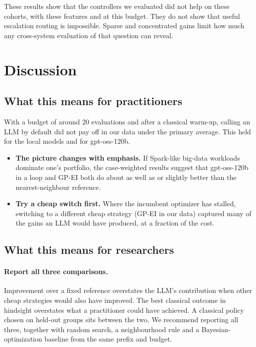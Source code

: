 These results show that the controllers we evaluated did not help on these cohorts, with these features and at this budget. They do not show that useful escalation routing is impossible. Sparse and concentrated gains limit how much any cross-system evaluation of that question can reveal.

\section{Discussion}

\subsection{What this means for practitioners}

With a budget of around 20 evaluations and after a classical warm-up, calling an LLM by default did not pay off in our data under the primary average. This held for the local models and for gpt-oss-120b.
\begin{itemize}
  \item \textbf{The picture changes with emphasis.} If Spark-like big-data workloads dominate one's portfolio, the case-weighted results suggest that gpt-oss-120b in a loop and GP-EI both do about as well as or slightly better than the nearest-neighbour reference.
  \item \textbf{Try a cheap switch first.} Where the incumbent optimizer has stalled, switching to a different cheap strategy (GP-EI in our data) captured many of the gains an LLM would have produced, at a fraction of the cost.
\end{itemize}

\subsection{What this means for researchers}

\paragraph{Report all three comparisons.} Improvement over a fixed reference overstates the LLM's contribution when other cheap strategies would also have improved. The best classical outcome in hindsight overstates what a practitioner could have achieved. A classical policy chosen on held-out groups sits between the two. We recommend reporting all three, together with random search, a neighbourhood rule and a Bayesian-optimization baseline from the same prefix and budget.

